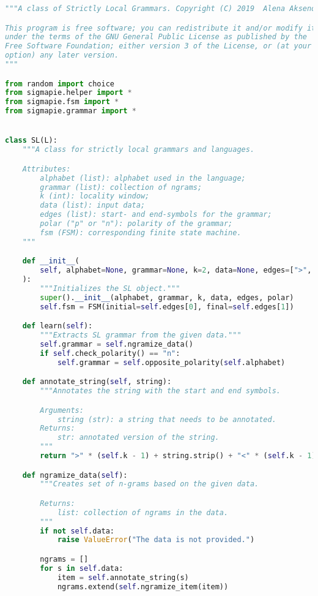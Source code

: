 \begin{lstlisting}[language=Python]
"""A class of Strictly Local Grammars. Copyright (C) 2019  Alena Aksenova.

This program is free software; you can redistribute it and/or modify it
under the terms of the GNU General Public License as published by the
Free Software Foundation; either version 3 of the License, or (at your
option) any later version.
"""

from random import choice
from sigmapie.helper import *
from sigmapie.fsm import *
from sigmapie.grammar import *


class SL(L):
    """A class for strictly local grammars and languages.

    Attributes:
        alphabet (list): alphabet used in the language;
        grammar (list): collection of ngrams;
        k (int): locality window;
        data (list): input data;
        edges (list): start- and end-symbols for the grammar;
        polar ("p" or "n"): polarity of the grammar;
        fsm (FSM): corresponding finite state machine.
    """

    def __init__(
        self, alphabet=None, grammar=None, k=2, data=None, edges=[">", "<"], polar="p"
    ):
        """Initializes the SL object."""
        super().__init__(alphabet, grammar, k, data, edges, polar)
        self.fsm = FSM(initial=self.edges[0], final=self.edges[1])

    def learn(self):
        """Extracts SL grammar from the given data."""
        self.grammar = self.ngramize_data()
        if self.check_polarity() == "n":
            self.grammar = self.opposite_polarity(self.alphabet)

    def annotate_string(self, string):
        """Annotates the string with the start and end symbols.

        Arguments:
            string (str): a string that needs to be annotated.
        Returns:
            str: annotated version of the string.
        """
        return ">" * (self.k - 1) + string.strip() + "<" * (self.k - 1)

    def ngramize_data(self):
        """Creates set of n-grams based on the given data.

        Returns:
            list: collection of ngrams in the data.
        """
        if not self.data:
            raise ValueError("The data is not provided.")

        ngrams = []
        for s in self.data:
            item = self.annotate_string(s)
            ngrams.extend(self.ngramize_item(item))


\end{lstlisting}
